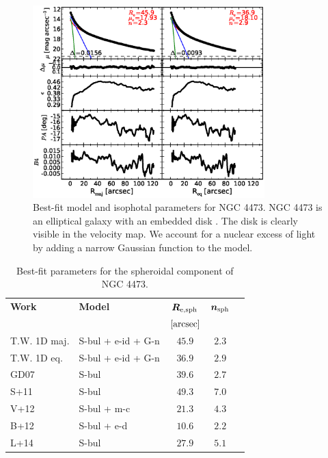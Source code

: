 \documentclass[preprint2]{emulateapj}
\newcommand{\fitfigurewidth}{0.8\textwidth}
\begin{document}
  \begin{figure}[h]
  \begin{center}
  \includegraphics[width=\fitfigurewidth]{images/n4473_1Dfit.eps}
  \caption{Best-fit model and isophotal parameters for NGC 4473.
  NGC 4473 is an elliptical galaxy with an embedded disk \citep{ledo2010}.
  The disk is clearly visible in the velocity map. 
  We account for a nuclear excess of light by adding a narrow Gaussian function to the model.
  }
  \end{center}
  \end{figure}
  
  \begin{table}[h]
  \small
  \caption{Best-fit parameters for the spheroidal component of NGC 4473.}
  \begin{center}
  \begin{tabular}{llccc}
  \hline
  {\bf Work} & {\bf Model}   & $\bm R_{\rm e,sph}$    & $\bm n_{\rm sph}$ \\
    &  &  $[\rm arcsec]$ & \\
  \hline
  T.W. 1D maj. & S-bul + e-id + G-n & $45.9$  &  $2.3$ \\
  T.W. 1D eq.  & S-bul + e-id + G-n & $36.9$  &  $2.9$ \\
  \hline
  GD07      & S-bul                 & $39.6$   &  $2.7$ \\
  S+11      & S-bul                 & $49.3$   &  $7.0$ \\
  V+12      & S-bul + m-c           & $21.3$   &  $4.3$ \\
  B+12      & S-bul + e-d           & $10.6$   &  $2.2$ \\
  L+14      & S-bul                 & $27.9$   &  $5.1$ \\
  \hline
  \end{tabular}
  \end{center}
  \label{tab:n4459}
  \end{table}
\end{document}
